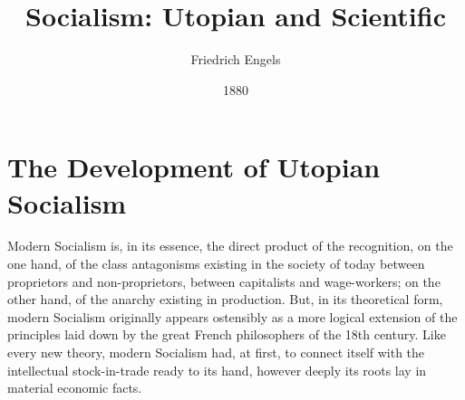 \documentclass[oneside, 12pt]{book}
\title{Socialism: Utopian and Scientific}
\author{Friedrich Engels}
\date{1880}
\begin{document}
\maketitle

\tableofcontents

\chapter{The Development of Utopian Socialism}

Modern Socialism is, in its essence, the direct product of the recognition, on
the one hand, of the class antagonisms existing in the society of today between
proprietors and non-proprietors, between capitalists and wage-workers; on the
other hand, of the anarchy existing in production. But, in its theoretical form,
modern Socialism originally appears ostensibly as a more logical extension of
the principles laid down by the great French philosophers of the 18th century.
Like every new theory, modern Socialism had, at first, to connect itself with
the intellectual stock-in-trade ready to its hand, however deeply its roots lay
in material economic facts.
\end{document}
